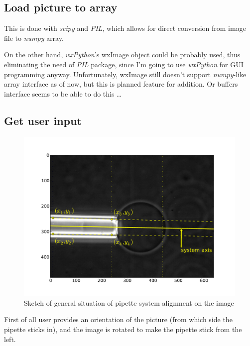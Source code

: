 \documentclass[a4paper,12pt]{article}
\begin{document}
\subsection{Load picture to array}\label{loadpic}

This is done with \emph{scipy} and \emph{PIL}, which allows for direct conversion from image file to \emph{numpy} array.

On the other hand, \emph{wxPython}'s wxImage object could be probably used, thus eliminating the need of \emph{PIL} package, since I'm going to use \emph{wxPython} for GUI programming anyway. Unfortunately, wxImage still doesn't support \emph{numpy}-like array interface as of now, but this is planned feature for addition. Or buffers interface seems to be able to do this \ldots

\subsection{Get user input}\label{getinput}

\begin{figure}%
\includegraphics[width=\columnwidth]{figs/pipetteaxis.pdf}%
\caption{Sketch of general situation of pipette system alignment on the image}%
\label{fig:pipetteaxis}%
\end{figure}

First of all user provides an orientation of the picture (from which side the pipette sticks in), and the image is rotated to make the pipette stick from the left.
\end{document}
